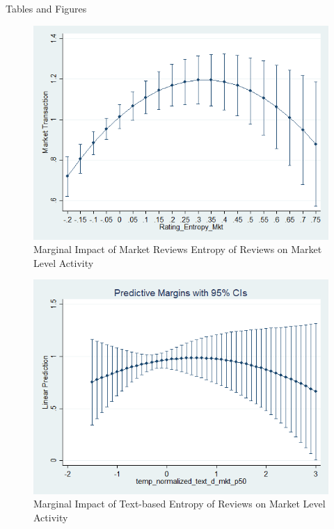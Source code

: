 \documentclass[msom,blindrev]{informs3}
\begin{document}
\begin{APPENDIX}{Tables and Figures}
\begin{figure}
	\centering
	\includegraphics[width=0.7\linewidth]{marginsplot_entmkt.png}
	\caption{Marginal Impact of Market Reviews Entropy of Reviews on Market Level Activity}
\end{figure}  
\begin{figure}
	\centering
	\includegraphics[width=0.7\linewidth]{marginsplot_text_ent_mkt.png}
	\caption{Marginal Impact of Text-based Entropy of Reviews on Market Level Activity}
\end{figure}  
\end{APPENDIX}
\clearpage
%
%
%
\end{document}
